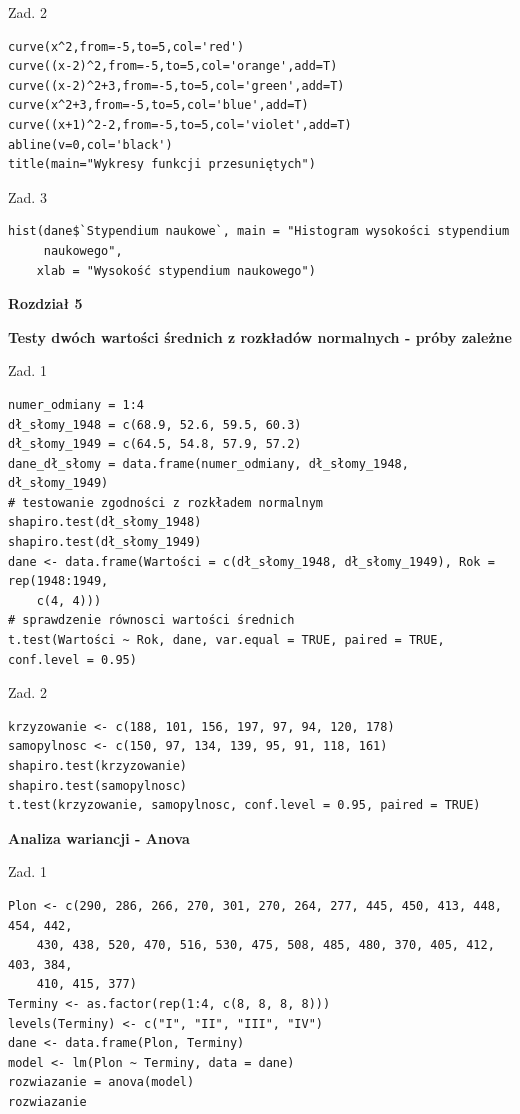\documentclass[12pt,B5paper,]{book}
\begin{document}
Zad. 2

\begin{verbatim}
curve(x^2,from=-5,to=5,col='red')
curve((x-2)^2,from=-5,to=5,col='orange',add=T)
curve((x-2)^2+3,from=-5,to=5,col='green',add=T)
curve(x^2+3,from=-5,to=5,col='blue',add=T)
curve((x+1)^2-2,from=-5,to=5,col='violet',add=T)
abline(v=0,col='black')
title(main="Wykresy funkcji przesuniętych")
\end{verbatim}

Zad. 3

\begin{verbatim}
hist(dane$`Stypendium naukowe`, main = "Histogram wysokości stypendium
     naukowego", 
    xlab = "Wysokość stypendium naukowego")
\end{verbatim}

\vspace{0.8cm} \textbf{Rozdział 5}

\textbf{Testy dwóch wartości średnich z rozkładów normalnych - próby
zależne}

Zad. 1

\begin{verbatim}
numer_odmiany = 1:4
dł_słomy_1948 = c(68.9, 52.6, 59.5, 60.3)
dł_słomy_1949 = c(64.5, 54.8, 57.9, 57.2)
dane_dł_słomy = data.frame(numer_odmiany, dł_słomy_1948, dł_słomy_1949)
# testowanie zgodności z rozkładem normalnym
shapiro.test(dł_słomy_1948)
shapiro.test(dł_słomy_1949)
dane <- data.frame(Wartości = c(dł_słomy_1948, dł_słomy_1949), Rok = rep(1948:1949, 
    c(4, 4)))
# sprawdzenie równosci wartości średnich
t.test(Wartości ~ Rok, dane, var.equal = TRUE, paired = TRUE, conf.level = 0.95)
\end{verbatim}

Zad. 2

\begin{verbatim}
krzyzowanie <- c(188, 101, 156, 197, 97, 94, 120, 178)
samopylnosc <- c(150, 97, 134, 139, 95, 91, 118, 161)
shapiro.test(krzyzowanie)
shapiro.test(samopylnosc)
t.test(krzyzowanie, samopylnosc, conf.level = 0.95, paired = TRUE)
\end{verbatim}

\vspace{0.8cm} \textbf{Analiza wariancji - Anova}

Zad. 1

\begin{verbatim}
Plon <- c(290, 286, 266, 270, 301, 270, 264, 277, 445, 450, 413, 448, 454, 442, 
    430, 438, 520, 470, 516, 530, 475, 508, 485, 480, 370, 405, 412, 403, 384, 
    410, 415, 377)
Terminy <- as.factor(rep(1:4, c(8, 8, 8, 8)))
levels(Terminy) <- c("I", "II", "III", "IV")
dane <- data.frame(Plon, Terminy)
model <- lm(Plon ~ Terminy, data = dane)
rozwiazanie = anova(model)
rozwiazanie
\end{verbatim}
\end{document}

